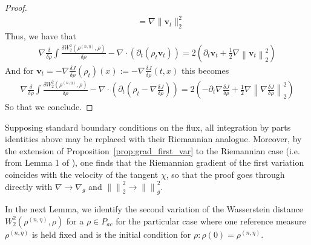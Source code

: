 \documentclass[reqno,11pt,letterpaper]{amsart}
\theoremstyle{plain}
\theoremstyle{definition}
\theoremstyle{remark}
\newcommand{\wagrad}{\nabla \frac{\delta J}{\delta \rho}}
\begin{document}
\begin{proof}
\begin{align*}
        &= \nabla \lVert \mathbf{v}_{t} \rVert_{2}^{2}
    \end{align*}
    Thus, we have that 
    \begin{align*}
        \nabla\frac{\delta}{\delta\rho} \int \frac{\delta W_{2}^{2}(\rho^{(n,\eta)}, \rho) }{\delta \rho} - \nabla\cdot\left( \partial_{t} (\rho_{t} \mathbf{v}_{t}  
    ) \right) = 2 \left( \partial_{t} \mathbf{v}_{t} +\frac{1}{2}\nabla \left\lVert \mathbf{v}_{t} \right\rVert_{2}^{2} \right)
    \end{align*}
    And for $\mathbf{v}_{t} = - \wagrad(\rho_{t}) (x) := - \wagrad(t, x)$ this becomes
    \begin{align*}
        \nabla\frac{\delta}{\delta\rho} \int \frac{\delta W_{2}^{2}(\rho^{(n,\eta)}, \rho) }{\delta \rho} - \nabla\cdot\left( \partial_{t} (\rho_{t} -\wagrad  
    ) \right) = 2 \left( - \partial_{t} \wagrad + \frac{1}{2}\nabla \left\lVert \wagrad \right\rVert_{2}^{2} \right)
    \end{align*}
    So that we conclude.
\end{proof}

Supposing standard boundary conditions on the flux, all integration by parts identities above may be replaced with their Riemannian analogue. Moreover, by the extension of Proposition~\ref{prop:grad_first_var} to the Riemannian case (i.e. from Lemma 1 of \cite{Lott2007}), one finds that the Riemannian gradient of the first variation coincides with the velocity of the tangent $\chi$, so that the proof goes through directly with $\nabla \to \nabla_{g}$ and $\left\lVert  \right\rVert_{2}^{2} \to \left\lVert  \right\rVert_{g}^{2}$.

In the next Lemma, we identify the second variation of the Wasserstein distance $W_{2}^{2}(\rho^{(n, \eta)}, \rho)$ for a $\rho \in {P}_{ac}$ for the particular case where one reference measure $\rho^{(n, \eta)}$ is held fixed and is the initial condition for $\rho: \rho(0) = \rho^{(n, \eta)}$.
\end{document}
